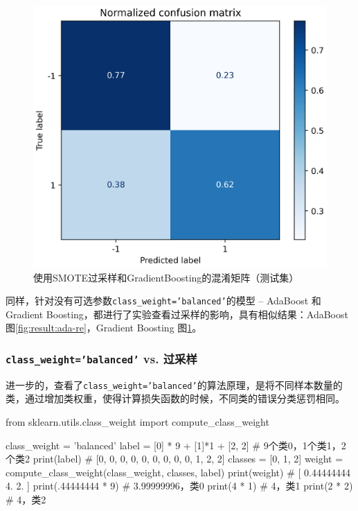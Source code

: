 \documentclass[a4paper]{article}
\begin{document}


\begin{figure}[!h]
    \centering
    \includegraphics[width=0.48\linewidth]{GradientBoosting-re_confus_mat-norm.png}
    \caption{使用SMOTE过采样和GradientBoosting的混淆矩阵（测试集）}
    \label{fig:result:grad-re}
\end{figure}

同样，针对没有可选参数\texttt{class\_weight='balanced'}的模型 -- AdaBoost 和Gradient Boosting，都进行了实验查看过采样的影响，具有相似结果：AdaBoost 图\ref{fig:result:ada-re}，Gradient Boosting 图\ref{fig:result:grad-re}。

\clearpage
\subsubsection{\texttt{class\_weight='balanced'} vs. 过采样}

进一步的，查看了\texttt{class\_weight='balanced'}的算法原理，是将不同样本数量的类，通过增加类权重，使得计算损失函数的时候，不同类的错误分类惩罚相同。
\begin{python}
from sklearn.utils.class_weight import compute_class_weight

class_weight = 'balanced'
label = [0] * 9 + [1]*1 + [2, 2] # 9个类0，1个类1，2个类2
print(label)  # [0, 0, 0, 0, 0, 0, 0, 0, 0, 1, 2, 2]
classes = [0, 1, 2]
weight = compute_class_weight(class_weight, classes, label)
print(weight)  # [ 0.44444444 4. 2. ]
print(.44444444 * 9)  # 3.99999996，类0
print(4 * 1)  # 4，类1
print(2 * 2)  # 4，类2
\end{python}
\end{document}
